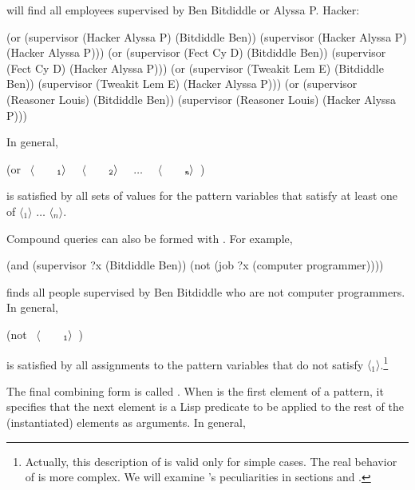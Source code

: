 \noindent
will find all employees supervised by Ben Bitdiddle or Alyssa P.  Hacker:

\begin{codeBlock}
(or (supervisor (Hacker Alyssa P) (Bitdiddle Ben))
    (supervisor (Hacker Alyssa P) (Hacker Alyssa P)))
(or (supervisor (Fect Cy D) (Bitdiddle Ben))
    (supervisor (Fect Cy D) (Hacker Alyssa P)))
(or (supervisor (Tweakit Lem E) (Bitdiddle Ben))
    (supervisor (Tweakit Lem E) (Hacker Alyssa P)))
(or (supervisor (Reasoner Louis) (Bitdiddle Ben))
    (supervisor (Reasoner Louis) (Hacker Alyssa P)))
\end{codeBlock}

\noindent
In general,

\begin{codeBlock}
(or ~\(\langle \)~~~~\(_{\mono{1}}\rangle \)~ ~\(\langle \)~~~~\(_{\mono{2}}\rangle \)~ ~\( \dots \)~ ~\(\langle \)~~~~\(_{\monoItalic{n}}\rangle \)~)
\end{codeBlock}

\noindent
is satisfied by all sets of values for the pattern variables that satisfy at
least one of \( \langle \)\( _1\rangle \) \( \dots \) \( \langle \)\( _n\rangle \).

Compound queries can also be formed with . For example,

\begin{codeBlock}
(and (supervisor ?x (Bitdiddle Ben))
     (not (job ?x (computer programmer))))
\end{codeBlock}

\noindent
finds all people supervised by Ben Bitdiddle who are not computer programmers.
In general,

\begin{codeBlock}
(not ~\(\langle \)~~~~\(_{\mono{1}}\rangle \)~)
\end{codeBlock}

\noindent
is satisfied by all assignments to the pattern variables that do not satisfy
\( \langle \)\( _1\rangle \).\footnote{Actually, this description of  is valid
only for simple cases.  The real behavior of  is more complex.  We
will examine 's peculiarities in sections  and
.}

The final combining form is called .  When 
is the first element of a pattern, it specifies that the next element is a Lisp
predicate to be applied to the rest of the (instantiated) elements as
arguments.  In general,

